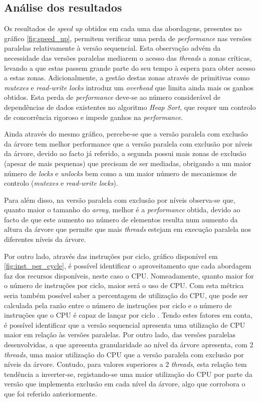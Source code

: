 \documentclass{article}
\begin{document}
\subsection{Análise dos resultados}

Os resultados de \textit{speed up} obtidos em cada uma das abordagens, presentes no gráfico \ref{fig:speed_up}, permitem verificar uma perda de 
\textit{performance} nas versões paralelas relativamente à versão sequencial. Esta observação advém da necessidade das versões paralelas mediarem o 
acesso das \textit{threads} a zonas críticas, levando a que estas passem grande parte do seu tempo à espera para obter acesso a estas zonas. Adicionalmente, a gestão destas zonas através de primitivas como \textit{mutexes} e \textit{read-write locks} introduz
um \textit{overhead} que limita ainda mais os ganhos obtidos. Esta perda de \textit{performance} deve-se ao número considerável de dependências 
de dados existentes no algoritmo \textit{Heap Sort}, que requer um controlo de concorrência rigoroso e impede ganhos na \textit{performance}. 

Ainda através do mesmo gráfico, percebe-se que a versão paralela com exclusão da árvore tem melhor performance que a versão 
paralela com exclusão por níveis da árvore, devido ao facto já referido, a segunda possui mais zonas de exclusão (apesar de 
mais pequenas) que precisam de ser mediadas, obrigando a um maior número de \textit{locks} e \textit{unlocks} bem como a um 
maior número de mecanismos de controlo (\textit{mutexes} e \textit{read-write locks}).

Para além disso, na versão paralela com exclusão por níveis observa-se que, quanto maior o tamanho do \textit{array}, melhor 
é a \textit{performance} obtida, devido ao facto de que este aumento no número de elementos resulta num aumento da altura da 
árvore que permite que mais \textit{threads} estejam em execução paralela nos diferentes níveis da árvore.

Por outro lado, através das instruções por ciclo, gráfico disponível em \ref{fig:inst_per_cycle}, é possível identificar o 
aproveitamento que cada abordagem faz dos recursos disponíveis, neste caso o CPU. Nomeadamente, quanto maior for o número de 
instruções por ciclo, maior será o uso de CPU. Com esta métrica seria também possível saber a percentagem de utilização do CPU, 
que pode ser calculada pela razão entre o número de instruções por ciclo e o número de instruções que o CPU é capaz de lançar por 
ciclo \cite{cpuUtili}. Tendo estes fatores em conta, é possível identificar que a versão sequencial apresenta uma utilização de CPU 
maior em relação às versões paralelas. Por outro lado, das versões paralelas desenvolvidas, a que apresenta granularidade ao nível 
da árvore apresenta, com 2 \textit{threads}, uma maior utilização do CPU que a versão paralela com exclusão por níveis da árvore. 
Contudo, para valores superiores a 2 \textit{threads}, esta relação tem tendência a inverter-se, registando-se uma maior utilização 
do CPU por parte da versão que implementa exclusão em cada nível da árvore, algo que corrobora o que foi referido anteriormente.
\end{document}
